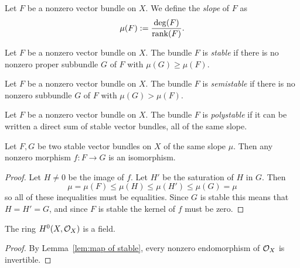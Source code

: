 \begin{definition} \label{def:slope of vector bundle}
Let $F$ be a nonzero vector bundle on $X$.
We define the \emph{slope} of $F$ as 
\[
\mu(F) := \frac{\deg(F)}{\operatorname{rank}(F)}.
\]
\end{definition}

\begin{definition} \label{def:stable bundle}
Let $F$ be a nonzero vector bundle on $X$.
The bundle $F$ is \emph{stable} if there is no nonzero proper subbundle $G$ of $F$ with $\mu(G) \geq \mu(F)$.
\end{definition}

\begin{definition} \label{def:semistable bundle}
Let $F$ be a nonzero vector bundle on $X$.
The bundle $F$ is \emph{semistable} if there is no nonzero subbundle $G$ of $F$ with $\mu(G) > \mu(F)$.
\end{definition}

\begin{definition} \label{def:polystable bundle}
Let $F$ be a nonzero vector bundle on $X$.
The bundle $F$ is \emph{polystable} if it can be written a direct sum of stable vector bundles, all of the same slope.
\end{definition}

\begin{lemma} \label{lem:map of stable}
Let $F,G$ be two stable vector bundles on $X$ of the same slope $\mu$.
Then any nonzero morphism $f\colon F \to G$ is an isomorphism.
\end{lemma}
\begin{proof}
Let $H \neq 0$ be the image of $f$.
Let $H'$ be the saturation of $H$ in $G$. 
Then
\[
\mu = \mu(F) \leq \mu(H) \leq \mu(H') \leq \mu(G) = \mu
\]
so all of these inequalities must be equalities. Since $G$ is stable this means that $H = H' = G$, and since $F$ is stable the kernel of $f$ must be zero.
\end{proof}

\begin{corollary} \label{cor:function field of curve}
The ring $H^0(X, \mathcal{O}_X)$ is a field.
\end{corollary}
\begin{proof}
By Lemma~\ref{lem:map of stable}, every nonzero endomorphism of $\mathcal{O}_X$ is invertible.
\end{proof}

